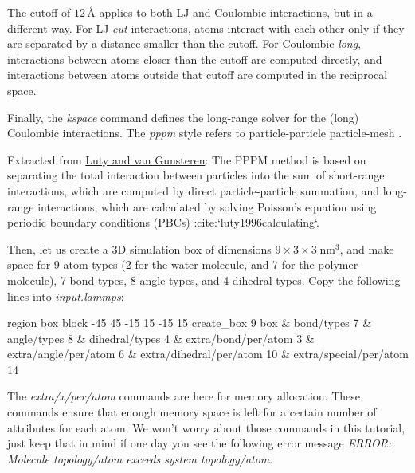 \begin{tcolorbox}[colback=mylightblue!5!white,colframe=mylightblue!75!black,title=About cutoff in molecular dynamics]

\vspace{0.25cm} \noindent The cutoff of $12\,\text{Å}$ applies to both LJ and Coulombic
interactions, but in a different way. For LJ \textit{cut}
interactions, atoms interact with each other only if they
are separated by a distance smaller than the cutoff. For
Coulombic \textit{long}, interactions between atoms closer than
the cutoff are computed directly, and interactions between
atoms outside that cutoff are computed in the reciprocal space.
\end{tcolorbox}

\noindent Finally, the \textit{kspace} command defines the long-range solver for the (long)
Coulombic interactions. The \textit{pppm} style refers to
particle-particle particle-mesh \cite{luty1996calculating}.

\begin{tcolorbox}[colback=mylightblue!5!white,colframe=mylightblue!75!black,title=About PPPM]

\vspace{0.25cm} \noindent Extracted from \href{https://doi.org/10.1021/jp9518623}{Luty and van Gunsteren}:
The PPPM method is based on separating the total interaction
between particles into the sum of short-range
interactions, which are computed by direct
particle-particle summation, and long-range interactions,
which are calculated by solving Poisson's equation using
periodic boundary conditions (PBCs) :cite:`luty1996calculating`.
\end{tcolorbox}

\noindent Then, let us create a 3D simulation box of dimensions $9 \times 3 \times 3 \; \text{nm}^3$,
and make space for 9 atom types (2 for
the water molecule, and 7 for the polymer molecule), 7 bond types, 8
angle types, and 4 dihedral types.
Copy the following lines into \textit{input.lammps}:

\begin{lcverbatim}
region box block -45 45 -15 15 -15 15
create_box 9 box &
bond/types 7 &
angle/types 8 &
dihedral/types 4 &
extra/bond/per/atom 3 &
extra/angle/per/atom 6 &
extra/dihedral/per/atom 10 &
extra/special/per/atom 14
\end{lcverbatim}

\noindent \begin{tcolorbox}[colback=mylightblue!5!white,colframe=mylightblue!75!black,title=About extra per atom commands]

\vspace{0.25cm} \noindent The \textit{extra/x/per/atom} commands are here for
memory allocation. These commands ensure that enough memory space is left for a
certain number of attributes for each atom. We won't worry
about those commands in this tutorial, just keep that in mind if one day
you see the following error
message \textit{ERROR: Molecule topology/atom exceeds system topology/atom}.
\end{tcolorbox}

